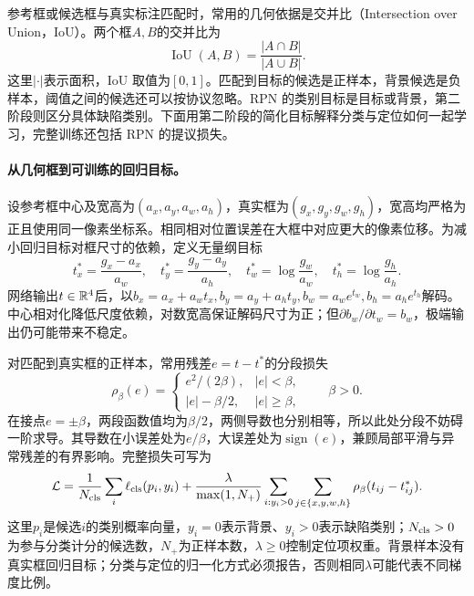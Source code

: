 参考框或候选框与真实标注匹配时，常用的几何依据是交并比（Intersection over Union，IoU）。两个框$A,B$的交并比为
\begin{equation}
 \operatorname{IoU}(A,B)=\frac{|A\cap B|}{|A\cup B|}.
\end{equation}
这里$|\cdot|$表示面积，IoU 取值为$[0,1]$。匹配到目标的候选是正样本，背景候选是负样本，阈值之间的候选还可以按协议忽略。RPN 的类别目标是目标或背景，第二阶段则区分具体缺陷类别。下面用第二阶段的简化目标解释分类与定位如何一起学习，完整训练还包括 RPN 的提议损失。

\paragraph{从几何框到可训练的回归目标。}
设参考框中心及宽高为$(a_x,a_y,a_w,a_h)$，真实框为$(g_x,g_y,g_w,g_h)$，宽高均严格为正且使用同一像素坐标系。相同相对位置误差在大框中对应更大的像素位移。为减小回归目标对框尺寸的依赖，定义无量纲目标
\begin{equation}
 t_x^*=\frac{g_x-a_x}{a_w},\quad t_y^*=\frac{g_y-a_y}{a_h},\quad
 t_w^*=\log\frac{g_w}{a_w},\quad t_h^*=\log\frac{g_h}{a_h}.
\end{equation}
网络输出$t\in\mathbb{R}^4$后，以$b_x=a_x+a_wt_x,b_y=a_y+a_ht_y,b_w=a_we^{t_w},b_h=a_he^{t_h}$解码。中心相对化降低尺度依赖，对数宽高保证解码尺寸为正；但$\partial b_w/\partial t_w=b_w$，极端输出仍可能带来不稳定。

对匹配到真实框的正样本，常用残差$e=t-t^*$的分段损失
\begin{equation}
 \rho_\beta(e)=\begin{cases}e^2/(2\beta),&|e|<\beta,\\|e|-\beta/2,&|e|\geq\beta,\end{cases}
 \qquad \beta>0.
\end{equation}
在接点$e=\pm\beta$，两段函数值均为$\beta/2$，两侧导数也分别相等，所以此处分段不妨碍一阶求导。其导数在小误差处为$e/\beta$，大误差处为$\operatorname{sign}(e)$，兼顾局部平滑与异常残差的有界影响。完整损失可写为
\begin{equation}
 \mathcal L=\frac1{N_{\rm cls}}\sum_i\ell_{\rm cls}(p_i,y_i)
 +\frac{\lambda}{\max(1,N_+)}\sum_{i:y_i>0}\sum_{j\in\{x,y,w,h\}}\rho_\beta(t_{ij}-t_{ij}^*).
\end{equation}
这里$p_i$是候选$i$的类别概率向量，$y_i=0$表示背景、$y_i>0$表示缺陷类别；$N_{\rm cls}>0$为参与分类计分的候选数，$N_+$为正样本数，$\lambda\geq0$控制定位项权重。背景样本没有真实框回归目标；分类与定位的归一化方式必须报告，否则相同$\lambda$可能代表不同梯度比例。

